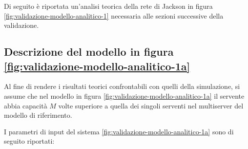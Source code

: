 Di seguito è riportata un'analisi teorica della rete di Jackson in figura \ref{fig:validazione-modello-analitico-1} necessaria alle sezioni successive della validazione.


\subsection{Descrizione del modello in figura \ref{fig:validazione-modello-analitico-1a}}
Al fine di rendere i risultati teorici confrontabili con quelli della simulazione, si assume che nel modello in figura \ref{fig:validazione-modello-analitico-1a} il servente abbia capacità $M$ volte superiore a quella dei singoli serventi nel multiserver del modello di riferimento.

I parametri di input del sistema \ref{fig:validazione-modello-analitico-1a} sono di seguito riportati:
